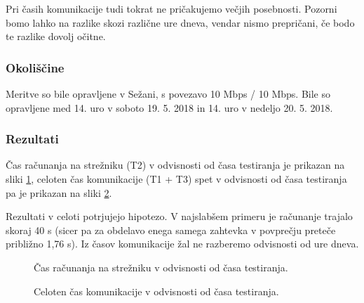 Pri časih komunikacije tudi tokrat ne pričakujemo večjih posebnosti. Pozorni bomo lahko na razlike skozi različne ure dneva, vendar nismo prepričani, če bodo te razlike dovolj očitne.

\subsubsection{Okoliščine}

Meritve so bile opravljene v Sežani, s povezavo 10 Mbps / 10 Mbps.
Bile so opravljene med 14. uro v soboto 19. 5. 2018 in 14. uro v nedeljo 20. 5. 2018.

\subsubsection{Rezultati}

Čas računanja na strežniku (T2) v odvisnosti od časa testiranja je prikazan na sliki \ref{fig:3_rezultati8_T2}, celoten čas komunikacije (T1 + T3) spet v odvisnosti od časa testiranja pa je prikazan na sliki \ref{fig:3_rezultati8_T1T3}.

Rezultati v celoti potrjujejo hipotezo.
V najslabšem primeru je računanje trajalo skoraj 40 s (sicer pa za obdelavo enega samega zahtevka v povprečju preteče približno 1,76 s).
Iz časov komunikacije žal ne razberemo odvisnosti od ure dneva.

\begin{figure}[H]
    \caption{Čas računanja na strežniku v odvisnosti od časa testiranja.}
    \label{fig:3_rezultati8_T2}
\end{figure}

\begin{figure}[H]
    \caption{Celoten čas komunikacije v odvisnosti od časa testiranja.}
    \label{fig:3_rezultati8_T1T3}
\end{figure}



